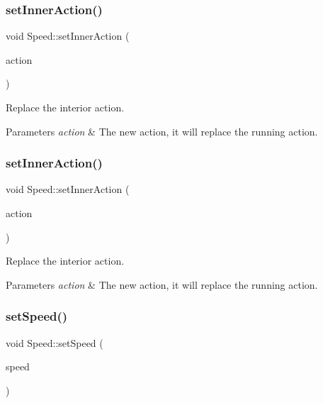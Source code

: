 \subsubsection{\texorpdfstring{set\+Inner\+Action()}{setInnerAction()}\hspace{0.1cm}{\footnotesize\ttfamily [1/2]}}
{\footnotesize\ttfamily void Speed\+::set\+Inner\+Action (\begin{DoxyParamCaption}\item[{\hyperlink{classActionInterval}{Action\+Interval} $\ast$}]{action }\end{DoxyParamCaption})}

Replace the interior action.


\begin{DoxyParams}{Parameters}
{\em action} & The new action, it will replace the running action. \\
\hline
\end{DoxyParams}
\mbox{\label{classSpeed_abc885c86093d27f1c120ba094beb042d}} 
\subsubsection{\texorpdfstring{set\+Inner\+Action()}{setInnerAction()}\hspace{0.1cm}{\footnotesize\ttfamily [2/2]}}
{\footnotesize\ttfamily void Speed\+::set\+Inner\+Action (\begin{DoxyParamCaption}\item[{\hyperlink{classActionInterval}{Action\+Interval} $\ast$}]{action }\end{DoxyParamCaption})}

Replace the interior action.


\begin{DoxyParams}{Parameters}
{\em action} & The new action, it will replace the running action. \\
\hline
\end{DoxyParams}
\mbox{\label{classSpeed_ae2405e5be01d9c31ca97281088f70edf}} 
\subsubsection{\texorpdfstring{set\+Speed()}{setSpeed()}\hspace{0.1cm}{\footnotesize\ttfamily [1/2]}}
{\footnotesize\ttfamily void Speed\+::set\+Speed (\begin{DoxyParamCaption}\item[{float}]{speed }\end{DoxyParamCaption})\hspace{0.3cm}{\ttfamily [inline]}}

